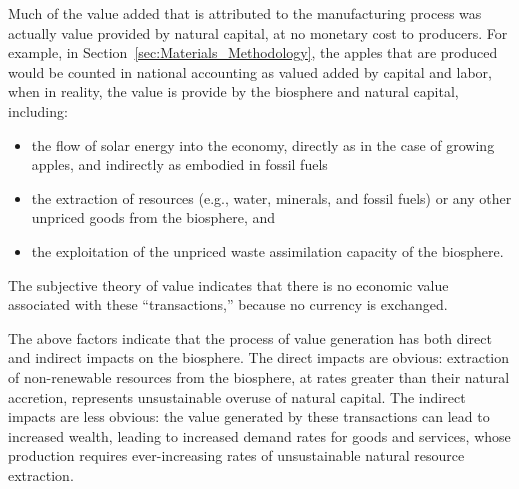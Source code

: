 Much
of the 
value added that is attributed to the manufacturing
process was actually value provided by 
natural capital, at  no  
monetary cost to producers. For example, in Section~\ref{sec:Materials_Methodology}, the
apples that are produced would be counted
in national accounting as valued added by capital 
and labor, when in reality, the value is provide
by the biosphere and natural capital,  including:
%
\begin{itemize}
	\item{the flow of solar energy
	into the economy, directly as in the case
	of growing apples, and indirectly as embodied
	in fossil fuels}
	
	\item{the extraction of resources (e.g., water, minerals, and
	fossil fuels) or any other unpriced goods from the biosphere, and}
	
	\item{the exploitation of the unpriced waste assimilation capacity of the biosphere.}
\end{itemize}
%
The subjective theory of value indicates that 
there is no economic value associated with these ``transactions,'' 
because no currency is exchanged. 

The above factors indicate that the process of value generation
has both direct and indirect impacts on the biosphere.
The direct impacts are obvious: 
extraction of non-renewable resources from the biosphere, 
at rates greater than their natural accretion,
represents unsustainable overuse of natural capital.
The indirect impacts are less obvious: 
the value generated by these transactions can lead to increased wealth,
leading to increased demand rates for goods and services, 
whose production requires ever-increasing rates 
of unsustainable natural resource extraction.





